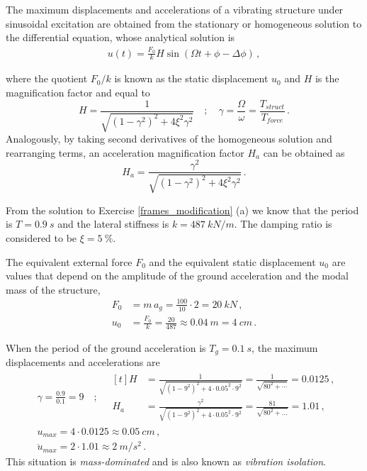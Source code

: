 \begin{Answer}[ref={frame_ground_acceleration}]
The maximum displacements and accelerations of a vibrating structure under sinusoidal excitation are obtained from the stationary or homogeneous solution to the differential equation, whose analytical solution is
\begin{align*}
u(t) = \frac{F_0}{k}H\sin(\Omega t + \phi - \Delta\phi)\,,
\end{align*}

where the quotient $F_0/k$ is known as the static displacement $u_{0}$ and $H$ is the magnification factor and equal to
$$
H = \frac{1}{\sqrt{(1-\gamma^2)^2 + 4\xi^2\gamma^2}} \quad ; \quad
\gamma = \frac{\Omega}{\omega} = \frac{T_{struct}}{T_{force}}\,.
$$
Analogously, by taking second derivatives of the homogeneous solution and rearranging terms, an acceleration magnification factor $H_a$ can be obtained as
$$
H_a = \frac{\gamma^2}{\sqrt{(1-\gamma^2)^2 + 4\xi^2\gamma^2}} \,.
$$

From the solution to Exercise \ref{frames_modification} (a) we know that the period is $T=\SI{0.9}{s}$ and the lateral stiffness is $k=\SI{487}{kN/m}$. The damping ratio is considered to be $\xi=\SI{5}{\%}$.

The equivalent external force $F_0$ and the equivalent static displacement $u_{0}$ are values that depend on the amplitude of the ground acceleration and the modal mass of the structure,
\begin{align*}
F_{0} &= m\,a_{g} = \frac{100}{10}\cdot2 = \SI{20}{kN} \,, \\
u_{0} &= \frac{F_0}{k} = \frac{20}{487} \approx \SI{0.04}{m} = \SI{4}{cm} \,.
\end{align*}


When the period of the ground acceleration is $T_g=\SI{0.1}{s}$, the maximum displacements and accelerations are
\begin{align*}
&\gamma = \frac{0.9}{0.1} = 9 \quad ; \quad \begin{aligned}[t]
    H &= \frac{1}{\sqrt{(1-9^2)^2 + 4\cdot 0.05^2\cdot 9^2}} = \frac{1}{\sqrt{80^2 + \cdots}} = 0.0125 \,, \\
    H_a &= \frac{\gamma^2}{\sqrt{(1-9^2)^2 + 4\cdot 0.05^2\cdot 9^2}} = \frac{81}{\sqrt{80^2+\dots}} = 1.01 \,,
\end{aligned} \\
&u_{max} = 4 \cdot 0.0125 \approx \SI{0.05}{cm} \,, \\
&\ddot{u}_{max} = 2 \cdot 1.01 \approx \SI{2}{m/s^2} \,.
\end{align*}
This situation is \emph{mass-dominated} and is also known as \emph{vibration isolation}.


\end{Answer}
